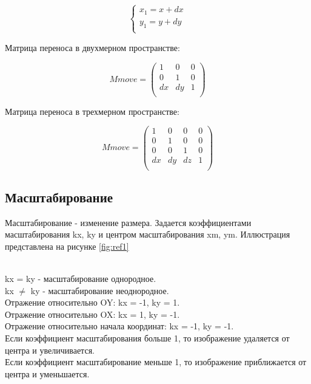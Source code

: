 \begin{equation}
	{\begin{cases}
			x_1 = x + dx \\
			y_1 = y + dy \\
		\end{cases}}
\end{equation}

Матрица переноса в двухмерном пространстве:

\begin{equation}
	Mmove = \left(
	\begin{array}{cccc}
			1  & 0  & 0 \\
			0  & 1  & 0 \\
			dx & dy & 1 \\
		\end{array}
	\right)
\end{equation}

Матрица переноса в трехмерном пространстве:

\begin{equation}
	Mmove = \left(
	\begin{array}{cccc}
			1  & 0  & 0  & 0 \\
			0  & 1  & 0  & 0 \\
			0  & 0  & 1  & 0 \\
			dx & dy & dz & 1 \\
		\end{array}
	\right)
\end{equation}

\subsection {Масштабирование}

Масштабирование - изменение размера. Задается коэффициентами масштабирования kx, ky и центром масштабирования xm, ym. Иллюстрация представлена на рисунке \ref{fig:ref1} \\
\begin{figure}[ht!]
\end{figure}
\\
kx = ky - масштабирование однородное.\\
kx $\neq$ ky - масштабирование неоднородное.\\
Отражение относительно OY: kx = -1, ky = 1.\\
Отражение относительно OX: kx = 1, ky = -1.\\
Отражение относительно начала координат: kx = -1, ky = -1.\\
Если коэффициент масштабирования больше 1, то изображение удаляется от центра и увеличивается.\\
Если коэффициент масштабирование меньше 1, то изображение приближается от центра и уменьшается.\\

